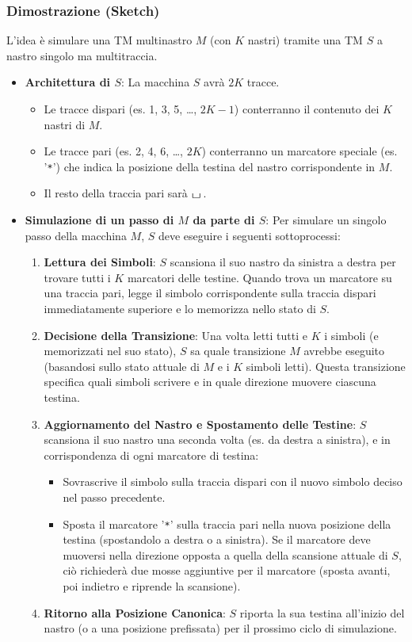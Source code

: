 \documentclass[a4paper]{article}
\theoremstyle{definition} %
\newcommand{\blankS}{\ensuremath{\raisebox{-0.15ex}{\scalebox{1.3}[0.7]{$\sqcup$}}\mkern2mu}}
\begin{document}
\subsubsection{Dimostrazione (Sketch)}
L'idea è simulare una TM multinastro $M$ (con $K$ nastri) tramite una TM $S$ a nastro singolo ma multitraccia.
\begin{itemize}
    \item \textbf{Architettura di $S$}: La macchina $S$ avrà $2K$ tracce.
        \begin{itemize}
            \item Le tracce dispari (es. 1, 3, 5, \dots, $2K-1$) conterranno il contenuto dei $K$ nastri di $M$.
            \item Le tracce pari (es. 2, 4, 6, \dots, $2K$) conterranno un marcatore speciale (es. '\texttt{*}') che indica la posizione della testina del nastro corrispondente in $M$.
            \item Il resto della traccia pari sarà $\blankS$.
        \end{itemize}
    \item \textbf{Simulazione di un passo di $M$ da parte di $S$}: Per simulare un singolo passo della macchina $M$, $S$ deve eseguire i seguenti sottoprocessi:
        \begin{enumerate}
            \item \textbf{Lettura dei Simboli}: $S$ scansiona il suo nastro da sinistra a destra per trovare tutti i $K$ marcatori delle testine. Quando trova un marcatore su una traccia pari, legge il simbolo corrispondente sulla traccia dispari immediatamente superiore e lo memorizza nello stato di $S$.
            \item \textbf{Decisione della Transizione}: Una volta letti tutti e $K$ i simboli (e memorizzati nel suo stato), $S$ sa quale transizione $M$ avrebbe eseguito (basandosi sullo stato attuale di $M$ e i $K$ simboli letti). Questa transizione specifica quali simboli scrivere e in quale direzione muovere ciascuna testina.
            \item \textbf{Aggiornamento del Nastro e Spostamento delle Testine}: $S$ scansiona il suo nastro una seconda volta (es. da destra a sinistra), e in corrispondenza di ogni marcatore di testina:
                \begin{itemize}
                    \item Sovrascrive il simbolo sulla traccia dispari con il nuovo simbolo deciso nel passo precedente.
                    \item Sposta il marcatore '\texttt{*}' sulla traccia pari nella nuova posizione della testina (spostandolo a destra o a sinistra). Se il marcatore deve muoversi nella direzione opposta a quella della scansione attuale di $S$, ciò richiederà due mosse aggiuntive per il marcatore (sposta avanti, poi indietro e riprende la scansione).
                \end{itemize}
            \item \textbf{Ritorno alla Posizione Canonica}: $S$ riporta la sua testina all'inizio del nastro (o a una posizione prefissata) per il prossimo ciclo di simulazione.
        \end{enumerate}
\end{itemize}
\end{document}
